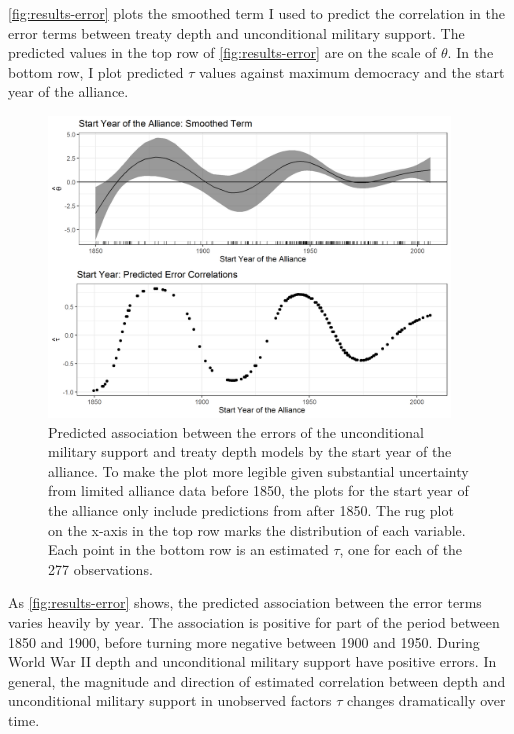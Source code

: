 \documentclass[12pt]{article}
\begin{document}
\autoref{fig:results-error} plots the smoothed term I used to predict the correlation in the error terms between treaty depth and unconditional military support. 
The predicted values in the top row of \autoref{fig:results-error} are on the scale of $\theta$. 
In the bottom row, I plot predicted $\tau$ values against maximum democracy and the start year of the alliance. 


\begin{figure}[hbtp]
\centering
\includegraphics[width=0.95\textwidth]{../figures/results-error.png}
\caption{Predicted association between the errors of the unconditional military support and treaty depth models by the start year of the alliance. To make the plot more legible given substantial uncertainty from limited alliance data before 1850, the plots for the start year of the alliance only include predictions from after 1850. The rug plot on the x-axis in the top row marks the distribution of each variable. Each point in the bottom row is an estimated $\tau$, one for each of the 277 observations.}
\label{fig:results-error}
\end{figure}

As \autoref{fig:results-error} shows, the predicted association between the error terms varies heavily by year. 
The association is positive for part of the period between 1850 and 1900, before turning more negative between 1900 and 1950. 
During World War II depth and unconditional military support have positive errors. 
In general, the magnitude and direction of estimated correlation between depth and unconditional military support in unobserved factors $\tau$ changes dramatically over time.  
\end{document}
